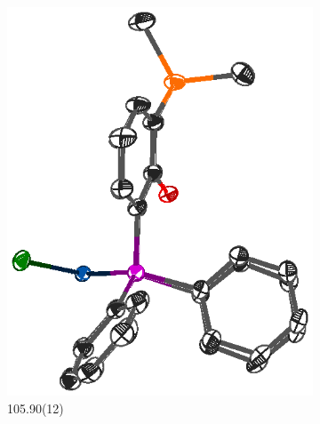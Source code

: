 \begin{figure}[htbp]
        \centering
        \begin{subfigure}[b]{0.3\textwidth}
                \includegraphics[width=\textwidth]{../Othercrystals/PtCl2/630063side.eps}
                \caption{105.90(12)\degrees{}\cite{Duren2007}}
                \label{PtCl2SiPhside}
        \end{subfigure}%
        ~ 
        \begin{subfigure}[b]{0.25\textwidth}

\end{subfigure}
\end{figure}
